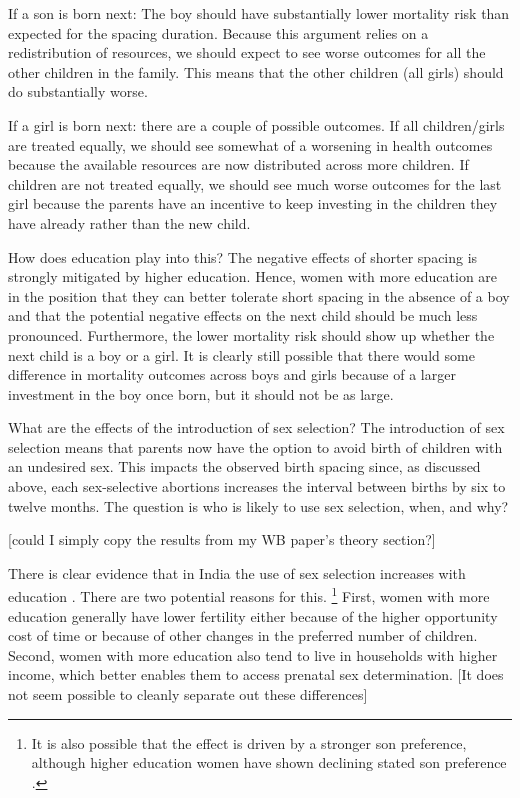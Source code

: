 If a son is born next:
The boy should have substantially lower mortality risk than expected for the spacing
duration.
Because this argument relies on a redistribution of resources, we should expect to see
worse outcomes for all the other children in the family.
This means that the other children (all girls) should do substantially worse.

If a girl is born next:
there are a couple of possible outcomes.
If all children/girls are treated equally, we should see somewhat of a worsening in 
health outcomes because the available resources are now distributed across more children.
If children are not treated equally, we should see much worse outcomes for the last
girl because the parents have an incentive to keep investing in the children they have
already rather than the new child.

How does education play into this?
The negative effects of shorter spacing is strongly mitigated by higher education.
Hence, women with more education are in the position that they can better tolerate short 
spacing in the absence of a boy and that the potential negative effects on the next child 
should be much less pronounced.
Furthermore, the lower mortality risk should show up whether the next child is a boy 
or a girl.
It is clearly still possible that there would some difference in mortality outcomes 
across boys and girls because of a larger investment in the boy once born, but it should
not be as large.

What are the effects of the introduction of sex selection?
The introduction of sex selection means that parents now have the option to avoid
birth of children with an undesired sex.
This impacts the observed birth spacing since, as discussed above, each sex-selective 
abortions increases the interval between births by six to twelve months.
The question is who is likely to use sex selection, when, and why?

[could I simply copy the results from my WB paper's theory section?]

There is clear evidence that in India the use of sex selection increases with education
\citep{das_gupta97,retherford03b,jha06,Guilmoto2009a,Bongaarts2013,Portner2015b,Jayachandran2017}.
There are two potential reasons for this.%
\footnote{
It is also possible that the effect is driven by a stronger son preference, although 
higher education women have shown declining stated son preference \citep{bhat03,pande07}.
}
First, women with more education generally have lower fertility either because of the
higher opportunity cost of time or because of other changes in the preferred number of
children.
Second, women with more education also tend to live in households with higher income,
which better enables them to access prenatal sex determination.
[It does not seem possible to cleanly separate out these differences]


